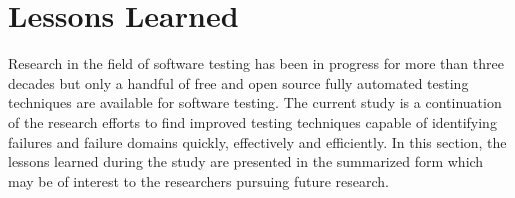




\section{Lessons Learned}
Research in the field of software testing has been in progress for more than three decades but only a handful of free and open source fully automated testing techniques are available for software testing. The current study is a continuation of the research efforts to find improved testing techniques capable of identifying failures and failure domains quickly, effectively and efficiently. In this section, the lessons learned during the study are presented in the summarized form which may be of interest to the researchers pursuing future research.
\clearpage

